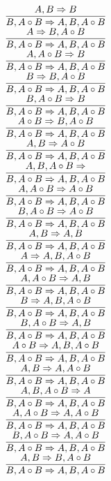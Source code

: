 \documentclass[11pt]{article}
\begin{document}
\begin{center}
\bigskip
\\$\infer{B, A\circ B\Rightarrow A, B, A\circ B}{A, B\Rightarrow B}$
\bigskip
\\$\infer{B, A\circ B\Rightarrow A, B, A\circ B}{A\Rightarrow B, A\circ B}$
\bigskip
\\$\infer{B, A\circ B\Rightarrow A, B, A\circ B}{A, A\circ B\Rightarrow B}$
\bigskip
\\$\infer{B, A\circ B\Rightarrow A, B, A\circ B}{B\Rightarrow B, A\circ B}$
\bigskip
\\$\infer{B, A\circ B\Rightarrow A, B, A\circ B}{B, A\circ B\Rightarrow B}$
\bigskip
\\$\infer{B, A\circ B\Rightarrow A, B, A\circ B}{A\circ B\Rightarrow B, A\circ B}$
\bigskip
\\$\infer{B, A\circ B\Rightarrow A, B, A\circ B}{A, B\Rightarrow A\circ B}$
\bigskip
\\$\infer{B, A\circ B\Rightarrow A, B, A\circ B}{A, B, A\circ B\Rightarrow }$
\bigskip
\\$\infer{B, A\circ B\Rightarrow A, B, A\circ B}{A, A\circ B\Rightarrow A\circ B}$
\bigskip
\\$\infer{B, A\circ B\Rightarrow A, B, A\circ B}{B, A\circ B\Rightarrow A\circ B}$
\bigskip
\\$\infer{B, A\circ B\Rightarrow A, B, A\circ B}{A, B\Rightarrow A, B}$
\bigskip
\\$\infer{B, A\circ B\Rightarrow A, B, A\circ B}{A\Rightarrow A, B, A\circ B}$
\bigskip
\\$\infer{B, A\circ B\Rightarrow A, B, A\circ B}{A, A\circ B\Rightarrow A, B}$
\bigskip
\\$\infer{B, A\circ B\Rightarrow A, B, A\circ B}{B\Rightarrow A, B, A\circ B}$
\bigskip
\\$\infer{B, A\circ B\Rightarrow A, B, A\circ B}{B, A\circ B\Rightarrow A, B}$
\bigskip
\\$\infer{B, A\circ B\Rightarrow A, B, A\circ B}{A\circ B\Rightarrow A, B, A\circ B}$
\bigskip
\\$\infer{B, A\circ B\Rightarrow A, B, A\circ B}{A, B\Rightarrow A, A\circ B}$
\bigskip
\\$\infer{B, A\circ B\Rightarrow A, B, A\circ B}{A, B, A\circ B\Rightarrow A}$
\bigskip
\\$\infer{B, A\circ B\Rightarrow A, B, A\circ B}{A, A\circ B\Rightarrow A, A\circ B}$
\bigskip
\\$\infer{B, A\circ B\Rightarrow A, B, A\circ B}{B, A\circ B\Rightarrow A, A\circ B}$
\bigskip
\\$\infer{B, A\circ B\Rightarrow A, B, A\circ B}{A, B\Rightarrow B, A\circ B}$

\end{center}
\end{document}
